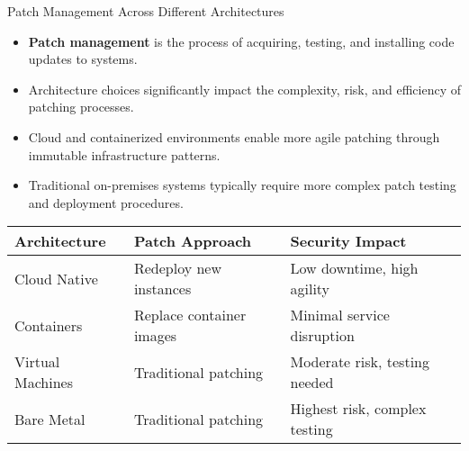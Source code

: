 \documentclass{beamer}
\begin{document}
            \begin{frame}{Patch Management Across Different Architectures}
            \begin{itemize}
            \item \textbf{Patch management} is the process of acquiring, testing, and installing code updates to systems.
            \item Architecture choices significantly impact the complexity, risk, and efficiency of patching processes.
            \item Cloud and containerized environments enable more agile patching through immutable infrastructure patterns.
            \item Traditional on-premises systems typically require more complex patch testing and deployment procedures.
            \end{itemize}
            
            \begin{table}
            \begin{tabular}{lll}
            \toprule
            \textbf{Architecture} & \textbf{Patch Approach} & \textbf{Security Impact} \\
            \midrule
            Cloud Native & Redeploy new instances & Low downtime, high agility \\
            Containers & Replace container images & Minimal service disruption \\
            Virtual Machines & Traditional patching & Moderate risk, testing needed \\
            Bare Metal & Traditional patching & Highest risk, complex testing \\
            \bottomrule
            \end{tabular}
            \end{table}
            \end{frame}
            
\end{document}
